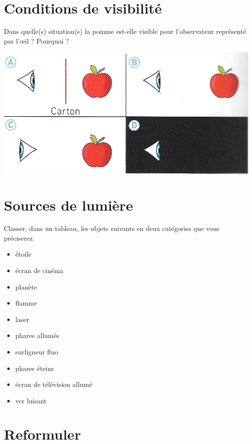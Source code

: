 \documentclass[a4paper,11pt]{exam}
\begin{document}
\vspace*{-0.5cm}
\section{Conditions de visibilité}

Dans quelle(s) situation(s) la pomme est-elle visible pour l'observateur représenté par l'\oe il ? Pourquoi ?


\begin{center}
	\includegraphics[scale=0.5]{vision}
\end{center}
\section{Sources de lumière}

Classer, dans un tableau, les objets suivants en deux catégories que vous préciserez.

\begin{multicols}{4}
	\begin{itemize}
		\item étoile
		\item écran de cinéma
		\item planète
		\item flamme
		\item laser
		\item phares allumés
		\item surligneur fluo
		\item phares éteins
		\item écran de télévision allumé
		\item ver luisant
\end{itemize}

\end{multicols}

\vspace*{-0.5cm}
\section{Reformuler}
\end{document}
